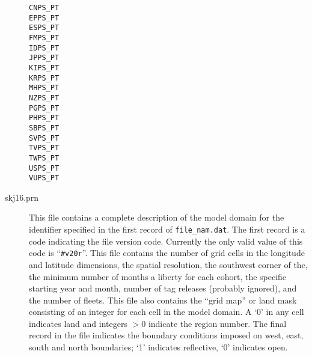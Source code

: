 \begin{description}
{\begin{verbatim}
CNPS_PT
EPPS_PT
ESPS_PT
FMPS_PT
IDPS_PT
JPPS_PT
KIPS_PT
KRPS_PT
MHPS_PT
NZPS_PT
PGPS_PT
PHPS_PT
SBPS_PT
SVPS_PT
TVPS_PT
TWPS_PT
USPS_PT
VUPS_PT
\end{verbatim}
\par}
\item[skj16.prn] This file contains a complete description of the
model domain for the identifier
specified in the first record of {\tt file\_nam.dat}. 
The first record is a code indicating the file version code. Currently
the only valid value of this code is ``\verb|#v20r|''.
This file
contains the number of grid cells in the longitude and latitude
dimensions, the spatial resolution, the southwest corner of the, the
minimum number of months a liberty for each cohort, the specific
starting year and month, number of tag releases (probably ignored),
and the number of fleets. This file also contains the ``grid map'' or
land mask consisting of an integer for each cell in the model domain.
A `0' in any cell indicates land and integers $>0$ indicate the region
number. The final record in the file indicates the boundary conditions
imposed on
west, east, south and north boundaries; `1' indicates reflective, `0'
indicates open.
 

\end{description}

